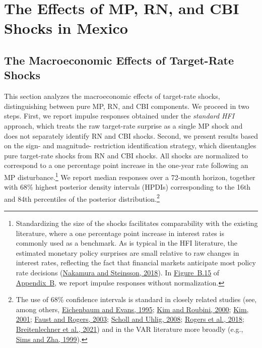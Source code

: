 \documentclass[\latexroot/\projectname]{subfiles}
\begin{document}
\section{The Effects of MP, RN, and CBI Shocks in Mexico}
\hypertarget{Section 3}{}

\subsection{The Macroeconomic Effects of Target-Rate Shocks}

This section analyzes the macroeconomic effects of target-rate shocks, distinguishing between pure MP, RN, and CBI components. We proceed in two steps. First, we report impulse responses obtained under the \emph{standard HFI} approach, which treats the raw target-rate surprise as a single MP shock and does not separately identify RN and CBI shocks. Second, we present results based on the sign- and magnitude-
restriction identification strategy, which disentangles pure target-rate shocks from RN and CBI shocks. All shocks are normalized to correspond to a one percentage point increase in the one-year rate following an MP disturbance.\footnote{Standardizing the size of the shocks facilitates comparability with the existing literature, where a one percentage point increase in interest rates is commonly used as a benchmark. As is typical in the HFI literature, the estimated monetary policy surprises are small relative to raw changes in interest rates, reflecting the fact that financial markets anticipate most policy rate decisions (\hyperlink{Nakamura and Steinsson (2018)}{Nakamura and Steinsson, 2018}). In \hyperlink{Figure B.15}{Figure~B.15} of \hyperlink{Appendix B}{Appendix~B}, we report impulse responses without normalization.} We report median responses over a 72-month horizon, together with 68\% highest posterior density intervals (HPDIs) corresponding to the 16th and 84th percentiles of the posterior distribution.\footnote{The use of 68\% confidence intervals is standard in closely related studies (see, among others, \hyperlink{Eichenbaum and Evans (1995)}{Eichenbaum and Evans, 1995}; \hyperlink{Kim and Roubini (2000)}{Kim and Roubini, 2000}; \hyperlink{Kim (2001)}{Kim, 2001}; \hyperlink{Faust and Rogers (2003)}{Faust and Rogers, 2003}; \hyperlink{Scholl and Uhlig (2008)}{Scholl and Uhlig, 2008}; \hyperlink{Rogers et al. (2018)}{Rogers et al., 2018}; \hyperlink{Breitenlechner et al. (2021)}{Breitenlechner et al., 2021}) and in the VAR literature more broadly (e.g., \hyperlink{Sims and Zha (1999)}{Sims and Zha, 1999}).}
\end{document}
